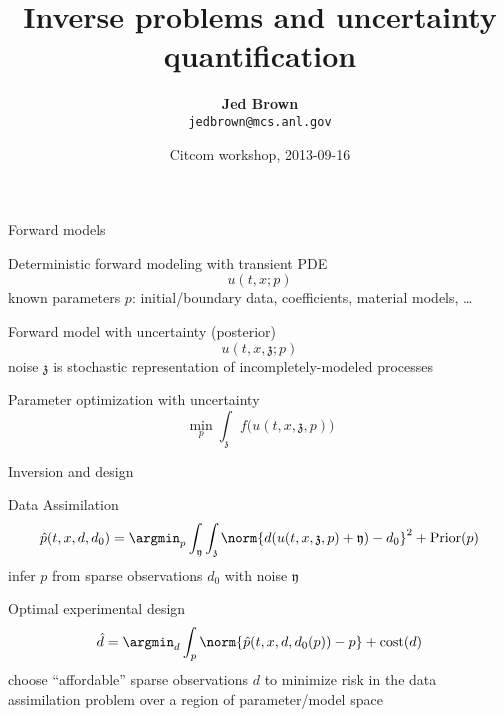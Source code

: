 \documentclass{beamer}
\title{Inverse problems and uncertainty quantification}
\author{{\bf Jed Brown} \\
\texttt{jedbrown@mcs.anl.gov}
}
\institute
{
  Mathematics and Computer Science Division \\ Argonne National Laboratory
}
\date{Citcom workshop, 2013-09-16}
\begin{document}
\lstset{language=C}
\normalem

\begin{frame}
  \titlepage
\end{frame}

\begin{frame}{Forward models}
  \begin{block}{Deterministic forward modeling with transient PDE}
    \begin{equation*}
      u(t,x; p)
    \end{equation*}
    known parameters $p$: initial/boundary data, coefficients, material models, \ldots
  \end{block}
  \begin{block}{Forward model with uncertainty (posterior)}
    \begin{equation*}
      u(t,x,\mathfrak z; p)
    \end{equation*}
    noise $\mathfrak z$ is stochastic representation of incompletely-modeled processes
  \end{block}
  \begin{block}{Parameter optimization with uncertainty}
    \begin{equation*}
      \min_p \int_{\mathfrak z} f\big(u(t,x,\mathfrak z,p) \big)
    \end{equation*}
  \end{block}
\end{frame}

\begin{frame}{Inversion and design}
  \begin{block}{Data Assimilation}
    \begin{equation*}
      \hat p(t,x,d,d_0) = \argmin_p \int_{\mathfrak y} \int_{\mathfrak z} \norm{d(u(t,x,\mathfrak z,p) + \mathfrak y) - d_0}^2 + \mathrm{Prior}(p)
    \end{equation*}
    infer $p$ from sparse observations $d_0$ with noise $\mathfrak y$
  \end{block}
  \begin{block}{Optimal experimental design}
    \begin{equation*}
      \hat d = \argmin_d \int_p \norm{\hat p(t,x,d,d_0(p)) - p} + \mathrm{cost}(d)
    \end{equation*}    
    choose ``affordable'' sparse observations $d$ to minimize risk in the data assimilation problem over a region of parameter/model space
  \end{block}
\end{frame}
\end{document}
